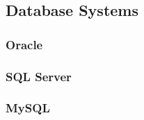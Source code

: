 
\subsection{Database Systems}

\subsubsection{Oracle}

\subsubsection{SQL Server}




\subsubsection{MySQL}

